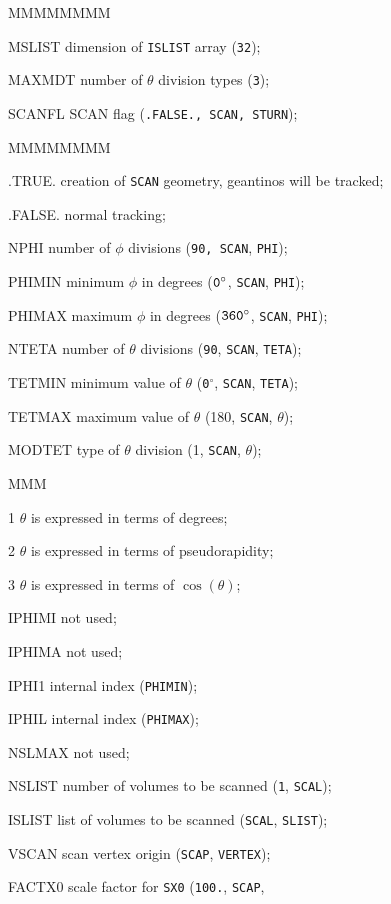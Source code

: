 \begin{DLtt}{MMMMMMMM}
\item[MSLIST] dimension of {\tt ISLIST} array ({\tt 32});
\item[MAXMDT] number of $\theta$ division types ({\tt 3});
\item[SCANFL] SCAN flag ({\tt .FALSE., SCAN, STURN});
\begin{DLtt}{MMMMMMMM}
\item[.TRUE.]creation of {\tt SCAN} geometry, geantinos will be tracked;
\item[.FALSE.]normal tracking;
\end{DLtt}
\item[NPHI] number of $\phi$ divisions ({\tt 90, SCAN}, {\tt PHI});
\item[PHIMIN] minimum $\phi$ in degrees (${\tt 0^{\circ}}$,
{\tt SCAN}, {\tt PHI});
\item[PHIMAX] maximum $\phi$ in degrees (${\tt 360^{\circ}}$,
{\tt SCAN}, {\tt PHI});
\item[NTETA] number of $\theta$ divisions ({\tt 90}, {\tt SCAN},
{\tt TETA});
\item[TETMIN] minimum value of $\theta$
({\tt 0}$^{\circ}$, {\tt SCAN}, {\tt TETA});
\item[TETMAX] maximum value of $\theta$ (180, {\tt SCAN}, {\tt $\theta$});
\item[MODTET] type of $\theta$ division (1, {\tt SCAN}, {\tt $\theta$});
\begin{DLtt}{MMM}
\item[1] $\theta$ is expressed in terms of degrees;
\item[2] $\theta$ is expressed in terms of pseudorapidity;
\item[3] $\theta$ is expressed in terms of $\cos(\theta)$;
\end{DLtt}
\item[IPHIMI] not used;
\item[IPHIMA] not used;
\item[IPHI1] internal index ({\tt PHIMIN});
\item[IPHIL] internal index ({\tt PHIMAX});
\item[NSLMAX] not used;
\item[NSLIST] number of volumes to be scanned ({\tt 1}, {\tt SCAL});
\item[ISLIST] list of volumes to be scanned ({\tt SCAL}, {\tt SLIST});
\item[VSCAN] scan vertex origin ({\tt SCAP}, {\tt VERTEX});
\item[FACTX0] scale factor for {\tt SX0} ({\tt 100.}, {\tt SCAP},

\end{DLtt}
